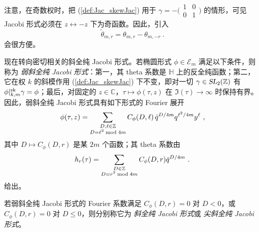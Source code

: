 \documentclass[11pt,a4paper,fontset=windows]{ctexart}
\numberwithin{equation}{section}
\newcommand{\SL}{\operatorname{\textsl{SL}}}      %
\newcommand{\CC}{\mathbb{C}}
\newcommand{\HH}{\mathbb{H}}
\newcommand{\ZZ}{\mathbb{Z}}
\newcommand{\E}{\mathcal{E}}
\newcommand{\xmod}{{\rm \;mod\;}}
\def\f{\phi}
\def\t{\tau}
\def\D{\Delta}
\newcommand{\sk}{{\rm sk}}
\newcommand{\be}{\begin{equation}}
\newcommand{\ee}{\end{equation}}
\begin{document}
注意，在奇数权时，把 (\ref{def:Jac_skewJac}) 用于 $\gamma = - \big(\begin{smallmatrix} 1& 0 \\ 0&1\end{smallmatrix}\big)$ 的情形，可见 Jacobi 形式必须在 $z\leftrightarrow -z$ 下为奇函数。因此，引入
\be\label{def:thetahat}
\tilde\theta_{m,r} = \theta_{m,r}-\theta_{m,-r}~.
\ee
会很方便。


现在转向密切相关的斜全纯 Jacobi 形式。若椭圆形式 $\f\in\E_m$ 满足以下条件，则称为 {\em 弱斜全纯 Jacobi 形式}：第一，其 theta 系数是 $\HH$ 上的反全纯函数；第二，它在权 $k$ 的斜模作用 (\ref{def:Jac_skewJac}) 下不变，即对一切 $\gamma \in \SL_2(\ZZ)$ 有 $\f\lvert_{k,m}^\sk\gamma =\f$；最后，对固定的 $z\in \CC$，$\tau \mapsto \f(\t,z)$ 在 $\Im(\tau)\to \infty$ 时保持有界。因此，弱斜全纯 Jacobi 形式具有如下形式的 Fourier 展开
\begin{gather}\label{eqn:jac:hol-DFoucffskw}
\f(\t,z) = 
\sum_{\substack{D,\ell \in \ZZ\\  D=\ell ^2  \xmod 4m} }C_\f(D,\ell )\, 
\bar q^{D/4m} q^{\ell ^2/4m} y^\ell ~,
\end{gather}
其中 $D\mapsto C_\f(D,r)$ 是某 $2m$ 个函数；其 theta 系数由
\begin{gather}\label{eqn:jac:hol-thtcoeffFoucoeff-skew}
h_r(\tau)=\sum_{\substack{D\in\ZZ\\D=r^2\xmod 4m}}C_\f(D,r)\bar q^{D/4m}~.
\end{gather}
给出。


若弱斜全纯 Jacobi 形式的 Fourier 系数满足 $C_\f(D,r)=0$ 对 $D < 0$，或 $C_{\f}(D,r)=0$ 对 $D \le0$，则分别称它为 {\em 斜全纯 Jacobi 形式}或 {\em 尖斜全纯 Jacobi 形式}。

\end{document}
